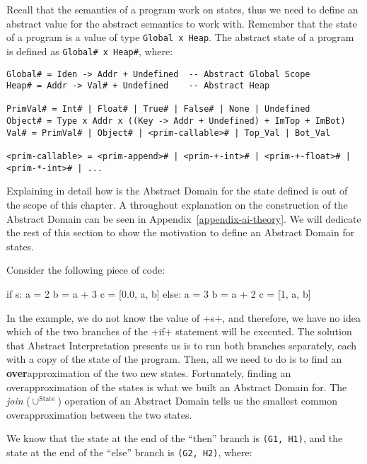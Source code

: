 Recall that the semantics of a program work on states, thus we need to define an abstract
value for the abstract semantics to work with. Remember that the state of a program is a
value of type \verb+Global x Heap+. The abstract state of a program is defined as
\verb+Global# x Heap#+, where:

\begin{verbatim}
Global# = Iden -> Addr + Undefined  -- Abstract Global Scope
Heap# = Addr -> Val# + Undefined    -- Abstract Heap

PrimVal# = Int# | Float# | True# | False# | None | Undefined
Object# = Type x Addr x ((Key -> Addr + Undefined) + ImTop + ImBot)
Val# = PrimVal# | Object# | <prim-callable># | Top_Val | Bot_Val

<prim-callable> = <prim-append># | <prim-+-int># | <prim-+-float># | <prim-*-int># | ...
\end{verbatim}

Explaining in detail how is the Abstract Domain for the state defined is out of the scope
of this chapter. A throughout explanation on the construction of the Abstract Domain can be
seen in Appendix~\ref{appendix-ai-theory}. We will dedicate the rest of this section
to show the motivation to define an Abstract Domain for states.

Consider the following piece of code:

\begin{pythoncode}
if s:
  a = 2
  b = a + 3
  c = [0.0, a, b]
else:
  a = 3
  b = a + 2
  c = [1, a, b]
\end{pythoncode}

In the example, we do not know the value of \pycode+s+, and therefore, we have no idea
which of the two branches of the \pycode+if+ statement will be executed. The solution that
Abstract Interpretation presents us is to run both branches separately, each with a copy
of the state of the program. Then, all we need to do is to find an
\textbf{over}approximation of the two new states. Fortunately, finding an
overapproximation of the states is what we built an Abstract Domain for. The
\textit{join} ($\cup^{\text{State}}$) operation of an Abstract Domain tells us the
smallest common overapproximation between the two states.

We know that the state at the end of the \enquote{then} branch is \verb|(G1, H1)|, and the
state at the end of the \enquote{else} branch is \verb|(G2, H2)|, where:


